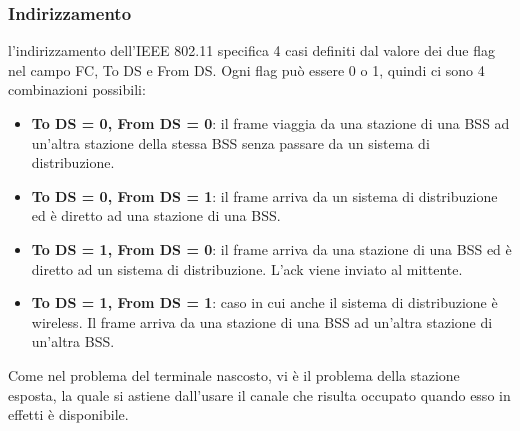 \documentclass[12pt]{report}
\begin{document}
\subsubsection{Indirizzamento}
l'indirizzamento dell'IEEE 802.11 specifica 4 casi definiti dal valore dei due flag nel campo FC, To DS e From DS. Ogni flag può essere 0 o 1, quindi ci sono 4 combinazioni possibili:
\begin{itemize}
	\item \textbf{To DS = 0, From DS = 0}: il frame viaggia da una stazione di una BSS ad un'altra stazione della stessa BSS senza passare da un sistema di distribuzione. 
	\item \textbf{To DS = 0, From DS = 1}: il frame arriva da un sistema di distribuzione ed è diretto ad una stazione di una BSS.
	\item \textbf{To DS = 1, From DS = 0}: il frame arriva da una stazione di una BSS ed è diretto ad un sistema di distribuzione. L'ack viene inviato al mittente.
	\item \textbf{To DS = 1, From DS = 1}: caso in cui anche il sistema di distribuzione è wireless. Il frame arriva da una stazione di una BSS ad un'altra stazione di un'altra BSS.
\end{itemize}
Come nel problema del terminale nascosto, vi è il problema della stazione esposta, la quale si astiene dall'usare il canale che risulta occupato quando esso in effetti è disponibile.
\end{document}
